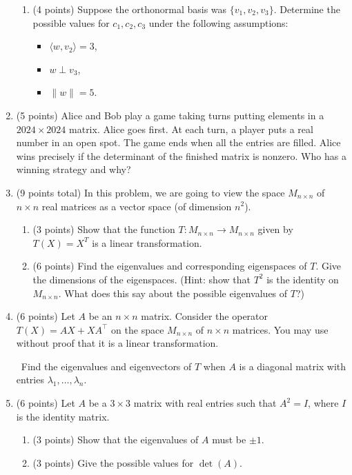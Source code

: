 \documentclass[12pt]{article}
\begin{document}
\begin{enumerate}
\begin{enumerate}
        \item (4 points) Suppose the orthonormal basis was $\{ v_1, v_2, v_3\}$. Determine the possible values for $c_1, c_2, c_3$ under the following assumptions: 
        \begin{itemize}
    \item $\langle w, v_2 \rangle = 3$,
    \item $w \perp v_3$,
    \item $\lVert w \rVert = 5$.
\end{itemize}
    \end{enumerate}

    \item (5 points) Alice and Bob play a game taking turns putting elements in a $2024 \times 2024$ matrix. Alice goes first. At each turn, a player puts a real number in an open spot. The game ends when all the entries are filled. Alice wins precisely if the determinant of the finished matrix is nonzero. Who has a winning strategy and why?
        
    

    \item (9 points total) In this problem, we are going to view the space \( M_{n \times n} \) of \( n \times n \) real matrices as a vector space (of dimension \( n^2 \)).
    \begin{enumerate}
        \item (3 points) Show that the function \( T: M_{n \times n} \to M_{n \times n} \) given by \( T(X) = X^T \) is a linear transformation.
        \item (6 points) Find the eigenvalues and corresponding eigenspaces of \( T \). Give the dimensions of the eigenspaces. (Hint: show that \( T^2 \) is the identity on \( M_{n \times n} \). What does this say about the possible eigenvalues of \( T \)?)
    \end{enumerate}
    
    \item (6 points) Let \( A \) be an \( n \times n \) matrix. Consider the operator \( T(X) = AX + XA^\top \) on the space \( M_{n \times n} \) of \( n \times n \) matrices. You may use without proof that it is a linear transformation.
    
    \
    Find the eigenvalues and eigenvectors of \( T \) when \( A \) is a diagonal matrix with entries \( \lambda_1, \dots, \lambda_n \).

\item (6 points) Let \( A \) be a \( 3 \times 3 \) matrix with real entries such that \( A^2 = I \), where \( I \) is the identity matrix.
\begin{enumerate}
    \item (3 points) Show that the eigenvalues of \( A \) must be \( \pm 1 \).
    \item (3 points) Give the possible values for \( \det(A) \).
\end{enumerate}


\end{enumerate}
\end{document}
